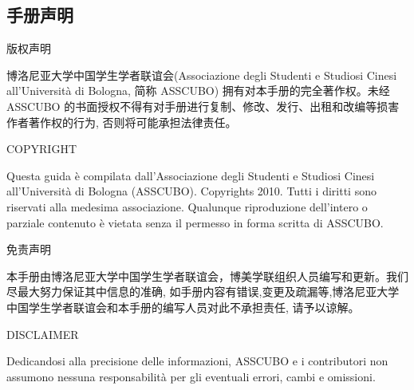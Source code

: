
\begin{titlepage}                  
% 

\topmargin=-2cm                        %

\chapter*{手册声明}                 %
\pagestyle{empty}%
\thispagestyle{empty} 

\vspace{0.5cm}\centerline{\Large 版权声明}
博洛尼亚大学中国学生学者联谊会(Associazione degli Studenti e Studiosi 
Cinesi all’Università di Bologna, 简称 ASSCUBO) 拥有对本手册的完全著作权。未经 ASSCUBO 的书面授权不得有对手册进行复制、修改、发行、出租和改编等损害作者著作权的行为, 否则将可能承担法律责任。 

\vspace{0.5cm}\centerline{\Large COPYRIGHT}
Questa guida è compilata dall’Associazione degli Studenti e Studiosi Cinesi all’Università di Bologna (ASSCUBO). Copyrights 2010. Tutti i diritti sono riservati alla medesima associazione. Qualunque riproduzione dell’intero o parziale contenuto è vietata senza il permesso in forma scritta di ASSCUBO. 

\vspace{0.5cm}\centerline{\Large 免责声明}
本手册由博洛尼亚大学中国学生学者联谊会，博美学联组织人员编写和更新。我们尽最大努力保证其中信息的准确, 如手册内容有错误,变更及疏漏等,博洛尼亚大学中国学生学者联谊会和本手册的编写人员对此不承担责任, 请予以谅解。 

\vspace{0.5cm}\centerline{\Large DISCLAIMER}
Dedicandosi alla precisione delle informazioni, ASSCUBO e i contributori non assumono nessuna responsabilità per gli eventuali errori, cambi e omissioni. 


\end{titlepage}
